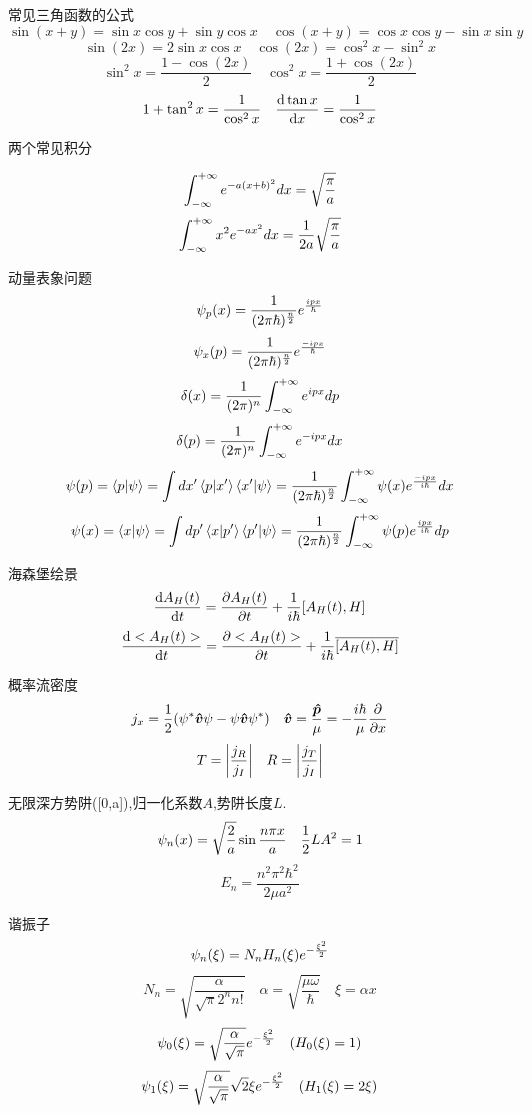 \documentclass{article}
\begin{document}
\begin{formal}
\begin{enumerate}
                常见三角函数的公式
                $$\sin(x+y)=\sin{x} \cos{y}+\sin{y}\cos{x} \quad \cos(x+y)=\cos{x} \cos{y} - \sin{x}\sin{y}$$ 
                $$\sin(2x) = 2\sin{x} \cos{x} \quad \cos(2x) = \cos^{2}{x} - \sin^{2}{x} $$
                $$\sin^{2}{x}=\frac{1-\cos(2x)}{2} \quad \cos^{2}{x}=\frac{1+\cos(2x)}{2} $$
                $$ 1 + \tan^{2}{x} = \frac{1}{\cos^{2}{x}} \quad \dv{\tan{x}}{x} = \frac{1}{\cos^{2}{x}} $$

                两个常见积分

                $$ \int_{-\infty}^{+\infty} e^{-a (x+b)^{2}} dx = \sqrt{\frac{\pi}{a}} $$
                $$ \int_{-\infty}^{+\infty} x^{2} e^{-a x^{2}} dx = \frac{1}{2a} \sqrt{\frac{\pi}{a}} $$

                动量表象问题
                $$ \psi_{p} (x) = \frac{1}{(2 \pi \hbar)^{\frac{n}{2}}} e^{\frac{ipx}{\hbar}} $$ 
                $$ \psi_{x} (p) = \frac{1}{(2 \pi \hbar)^{\frac{n}{2}}} e^{\frac{-ipx}{\hbar}} $$ 
                $$ \delta(x) = \frac{1}{(2\pi)^{n}} \int_{-\infty}^{+\infty} e^{ipx} dp $$
                $$ \delta(p) = \frac{1}{(2\pi)^{n}} \int_{-\infty}^{+\infty} e^{-ipx} dx $$
                $$ \psi(p) = \braket{p}{\psi} = \int dx' \braket{p}{x'} \braket{x'}{\psi} = \frac{1}{(2 \pi \hbar)^{\frac{n}{2}}} \int_{-\infty}^{+\infty} \psi(x) e^{\frac{-ipx}{i\hbar}} dx $$
                $$ \psi(x) = \braket{x}{\psi} = \int dp' \braket{x}{p'} \braket{p'}{\psi} = \frac{1}{(2 \pi \hbar)^{\frac{n}{2}}} \int_{-\infty}^{+\infty} \psi(p) e^{\frac{ipx}{i\hbar}}  dp $$

                海森堡绘景
                $$ \dv{A_{H}(t)}{t} = \pdv{A_{H}(t)}{t} + \frac{1}{i\hbar} [A_{H}(t),H] $$
                $$ \dv{<A_{H}(t)>}{t} = \pdv{<A_{H}(t)>}{t} + \frac{1}{i\hbar} \overline{[A_{H}(t),H]} $$

                概率流密度
                $$ j_{x} = \frac{1}{2} (\psi^{*} \vu*{v} \psi - \psi \vu*{v} \psi^{*} ) \quad \vu*{v} = \frac{\vu*{p}}{\mu} = - \frac{i\hbar}{\mu} \pdv{x} $$
                $$ T = \abs{\frac{j_{R}}{j_{I}}} \quad R = \abs{\frac{j_{T}}{j_{I}}} $$

                无限深方势阱([0,a]),归一化系数$A$,势阱长度$L$.
                $$ \psi_{n} (x) = \sqrt{\frac{2}{a}} \sin{\frac{n\pi x}{a}} \quad \frac{1}{2} L A^{2}  = 1 $$
                $$ E_{n} = \dfrac{n^{2}\pi^{2}\hbar^{2}}{2\mu a^{2}} $$

                谐振子
                $$ \psi_{n} (\xi) = N_{n} H_{n}(\xi) e^{-\frac{\xi^{2}}{2}} $$
                $$ N_{n} = \sqrt{\frac{\alpha}{\sqrt{\pi}2^{n} n!}}  \quad \alpha = \sqrt{\frac{\mu \omega}{\hbar}} \quad \xi = \alpha x $$
                $$ \psi_{0} (\xi) = \sqrt{\frac{\alpha}{\sqrt{\pi}}} e^{-\frac{\xi^{2}}{2}} \quad (H_{0}(\xi) = 1)$$
                $$ \psi_{1} (\xi) = \sqrt{\frac{\alpha}{\sqrt{\pi}}} \sqrt{2} \xi e^{-\frac{\xi^{2}}{2}} \quad (H_{1}(\xi) = 2\xi) $$
                

\end{enumerate}
\end{formal}
\end{document}
